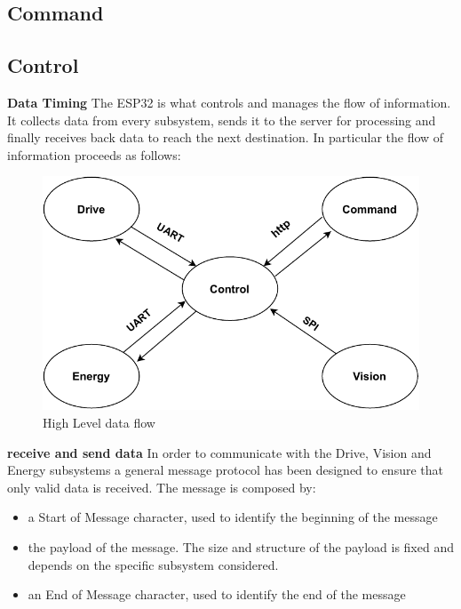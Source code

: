 \documentclass[10pt,twoside]{article}
\begin{document}
\subsection{Command}

\subsection{Control}
\textbf{Data Timing}
The ESP32 is what controls and manages the flow of information. It collects data from every subsystem, sends it to the server for processing and finally receives back data to reach the next destination.
\smallbreak
In particular the flow of information proceeds as follows:
\begin{figure}[hbt!]
    \centering
    \includegraphics[scale=0.35]{esp32_comms.pdf}
    \captionsetup{justification=centering}
    \caption{High Level data flow}
\end{figure}

\medskip

\textbf{receive and send data}
In order to communicate with the Drive, Vision and Energy subsystems a general message protocol has been designed to ensure that only valid data is received. The message is composed by:
\begin{itemize}
    \item a Start of Message character, used to identify the beginning of the message
    \item the payload of the message. The size and structure of the payload is fixed and depends on the specific subsystem considered.
    \item an End of Message character, used to identify the end of the message
\end{itemize}
\end{document}
